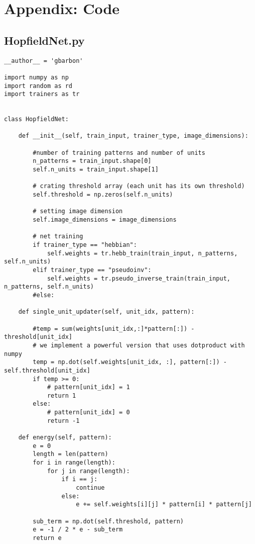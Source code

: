 \documentclass[letterpaper,twocolumn,10pt]{article}
\begin{document}
\section{Appendix: Code}

\subsection{HopfieldNet.py}
\begin{lstlisting}
__author__ = 'gbarbon'

import numpy as np
import random as rd
import trainers as tr


class HopfieldNet:

    def __init__(self, train_input, trainer_type, image_dimensions):

        #number of training patterns and number of units
        n_patterns = train_input.shape[0]
        self.n_units = train_input.shape[1]

        # crating threshold array (each unit has its own threshold)
        self.threshold = np.zeros(self.n_units)

        # setting image dimension
        self.image_dimensions = image_dimensions

        # net training
        if trainer_type == "hebbian":
            self.weights = tr.hebb_train(train_input, n_patterns, self.n_units)
        elif trainer_type == "pseudoinv":
            self.weights = tr.pseudo_inverse_train(train_input, n_patterns, self.n_units)
        #else:

    def single_unit_updater(self, unit_idx, pattern):

        #temp = sum(weights[unit_idx,:]*pattern[:]) - threshold[unit_idx]
        # we implement a powerful version that uses dotproduct with numpy
        temp = np.dot(self.weights[unit_idx, :], pattern[:]) - self.threshold[unit_idx]
        if temp >= 0:
            # pattern[unit_idx] = 1
            return 1
        else:
            # pattern[unit_idx] = 0
            return -1

    def energy(self, pattern):
        e = 0
        length = len(pattern)
        for i in range(length):
            for j in range(length):
                if i == j:
                    continue
                else:
                    e += self.weights[i][j] * pattern[i] * pattern[j]

        sub_term = np.dot(self.threshold, pattern)
        e = -1 / 2 * e - sub_term
        return e


\end{lstlisting}
\end{document}
